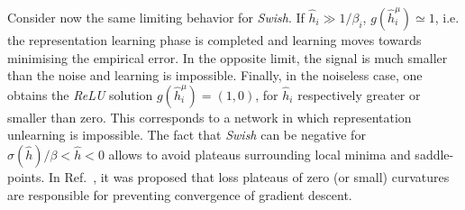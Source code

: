 \documentclass{article}
\begin{document}
Consider now the same limiting behavior for {\it Swish}. If $\hat{h}_i \gg 1/\beta_i$, $g(\hat{h}^{\mu}_i)\simeq 1$, i.e. the representation learning phase is completed and learning moves towards minimising the empirical error. In the opposite limit, the signal is much smaller than the noise and learning is impossible. Finally, in the noiseless case, one obtains the {\it ReLU} solution $g(\hat{h}^{\mu}_i) = (1, 0) $, for $\hat{h}_i $ respectively greater or smaller than zero. This corresponds to a network in which representation unlearning is impossible. The fact that {\it Swish} can be negative for $\sigma(\hat{h})/\beta <\hat{h}<0$ allows to avoid plateaus surrounding local minima and saddle-points. In Ref.~\cite{dauphin}, it was proposed that loss plateaus of zero (or small) curvatures are responsible for preventing convergence of gradient descent.
%
\end{document}
